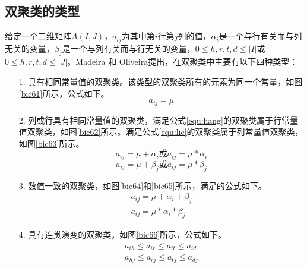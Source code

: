  \subsection{双聚类的类型}
  给定一个二维矩阵$A(I,J)$，$a_{ij}$为其中第$i$行第$j$列的值，$\alpha_i$是一个与行有关而与列无关的变量，$\beta_j$是一个与列有关而与行无关的变量，$0\le h,r,t,d \le |I|$或$0\le h,r,t,d \le |J|$。Madeira 和 Oliveira提出，在双聚类中主要有以下四种类型：
  \begin{enumerate}
    \item[1.] 具有相同常量值的双聚类。该类型的双聚类所有的元素为同一个常量，如图\ref{bic61}所示，公式如下。
    \begin{equation}
      a_{ij}=\mu
    \end{equation}

    \item[2.] 列或行具有相同常量值的双聚类，满足公式\ref{equ:hang}的双聚类属于行常量值双聚类，如图\ref{bic62}所示。满足公式\ref{equ:lie}的双聚类属于列常量值双聚类，如图\ref{bic63}所示。
    \begin{equation}\label{equ:hang}
    a_{ij}=\mu+\alpha_i \mbox{或} a_{ij}=\mu *\alpha_i 
    \end{equation}
    \begin{equation}\label{equ:lie}
    a_{ij}=\mu+\beta_j  \mbox{或} a_{ij}=\mu *\beta_j
    \end{equation}
    
    \item[3.] 数值一致的双聚类，如图\ref{bic64}和\ref{bic65}所示，满足的公式如下。
    \begin{align}
    a_{ij}=\mu+\alpha_i+\beta_j \label{equ:jiafa}\\
    a_{ij}=\mu *\alpha_i*\beta_j\label{equ:chengfa}
    \end{align} 

    \item[4.] 具有连贯演变的双聚类，如图\ref{bic66}所示，公式如下。
    \begin{align}
    a_{ih}\le a_{ir}\le a_{it}\le a_{id} \\
    a_{hj}\le a_{rj}\le a_{tj}\le  a_{dj} 
    \end{align}
  \end{enumerate}


